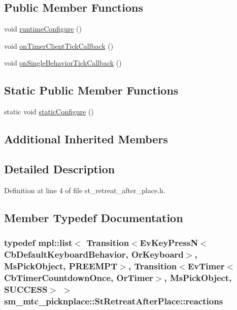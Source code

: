 \subsection*{Public Member Functions}
\begin{DoxyCompactItemize}
\item 
void \hyperlink{structsm__mtc__picknplace_1_1StRetreatAfterPlace_a7293693c74d8c2ca53b531c11e1ca31b}{runtime\+Configure} ()
\item 
void \hyperlink{structsm__mtc__picknplace_1_1StRetreatAfterPlace_acfaadf176b57a48c250661343b1018d8}{on\+Timer\+Client\+Tick\+Callback} ()
\item 
void \hyperlink{structsm__mtc__picknplace_1_1StRetreatAfterPlace_aca72dd5ba5515954b1deb5ce6c1b18bc}{on\+Single\+Behavior\+Tick\+Callback} ()
\end{DoxyCompactItemize}
\subsection*{Static Public Member Functions}
\begin{DoxyCompactItemize}
\item 
static void \hyperlink{structsm__mtc__picknplace_1_1StRetreatAfterPlace_a1f515bb05f0c66451d31e8cb987af77f}{static\+Configure} ()
\end{DoxyCompactItemize}
\subsection*{Additional Inherited Members}


\subsection{Detailed Description}


Definition at line 4 of file st\+\_\+retreat\+\_\+after\+\_\+place.\+h.



\subsection{Member Typedef Documentation}
\subsubsection[{\texorpdfstring{reactions}{reactions}}]{\setlength{\rightskip}{0pt plus 5cm}typedef mpl\+::list$<$ Transition$<$Ev\+Key\+PressN$<$Cb\+Default\+Keyboard\+Behavior, {\bf Or\+Keyboard}$>$, {\bf Ms\+Pick\+Object}, {\bf P\+R\+E\+E\+M\+PT}$>$, Transition$<$Ev\+Timer$<$Cb\+Timer\+Countdown\+Once, {\bf Or\+Timer}$>$, {\bf Ms\+Pick\+Object}, {\bf S\+U\+C\+C\+E\+SS}$>$ $>$ {\bf sm\+\_\+mtc\+\_\+picknplace\+::\+St\+Retreat\+After\+Place\+::reactions}}\hypertarget{structsm__mtc__picknplace_1_1StRetreatAfterPlace_a10691e7690f7087b795eaa28386d5f97}{}\label{structsm__mtc__picknplace_1_1StRetreatAfterPlace_a10691e7690f7087b795eaa28386d5f97}



